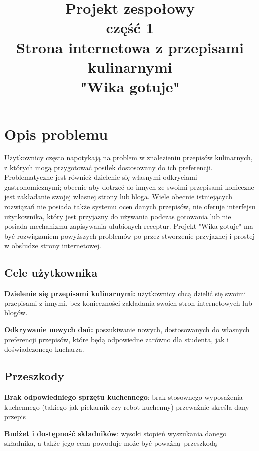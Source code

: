\documentclass{article}
\title{\fontsize{20}{22}\selectfont Projekt zespołowy\\ część 1\\Strona internetowa z przepisami kulinarnymi\\"Wika gotuje"}
\date{}
\newenvironment{itemize.zip}
{ \begin{itemize}
    \setlength{\itemsep}{0pt}
    \setlength{\parskip}{0pt}
    \setlength{\parsep}{0pt}     }
{ \end{itemize}                  }
\begin{document}
\section{Opis problemu}
\noindent
Użytkownicy często napotykają na problem w znalezieniu przepisów kulinarnych, z których mogą przygotować posiłek dostosowany do ich preferencji. Problematyczne jest również dzielenie
się własnymi odkryciami gastronomicznymi; obecnie aby dotrzeć do innych ze swoimi przepisami konieczne jest zakładanie swojej własnej strony lub bloga. Wiele obecnie istniejących
rozwiązań nie posiada także systemu ocen danych przepisów, nie oferuje interfejsu użytkownika, który jest przyjazny do używania podczas gotowania lub nie posiada mechanizmu zapisywania
ulubionych receptur. Projekt "Wika gotuje" ma być rozwiązaniem powyższych problemów po przez stworzenie przyjaznej i prostej w obsłudze strony internetowej.

\subsection{Cele użytkownika}
\begin{itemize.zip}
    \item \textbf{Dzielenie się przepisami kulinarnymi:} użytkownicy chcą dzielić się swoimi przepisami z innymi, bez konieczności zakładania swoich stron internetowych lub blogów.
    \item \textbf{Odkrywanie nowych dań:} poszukiwanie nowych, dostosowanych do własnych preferencji przepisów, które będą odpowiedne zarówno dla studenta, jak i doświadczonego kucharza.
\end{itemize.zip}

\subsection{Przeszkody}
\begin{itemize.zip}
    \item \textbf{Brak odpowiedniego sprzętu kuchennego}: brak stosownego wyposażenia kuchennego (takiego jak piekarnik czy robot kuchenny) przeważnie skreśla dany przepis
    \item \textbf{Budżet i dostępność składników}: wysoki stopień wyszukania danego składnika, a także jego cena powoduje może być poważną przeszkodą
\end{itemize.zip}
\end{document}
